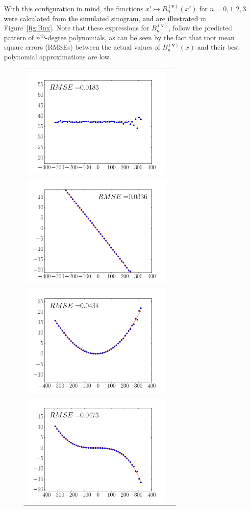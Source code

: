 \documentclass[letterpaper,twocolumn]{IEEEtran}
\newcommand{\bv}{\mathbf{v}}
\newcommand{\Bnv}{B_n^{(\bv)}}
\begin{document}
With this configuration in mind, the functions $x' \mapsto \Bnv(x')$ for $n = 0,1,2,3$ were calculated from the simulated sinogram, and are illustrated in Figure~\ref{fig:Bnx}. Note that these expressions for $\Bnv$, follow the predicted pattern of $n^{\textrm{th}}$-degree polynomials, as can be seen by the fact that root mean square errors (RMSEs) between the actual values of $\Bnv(x)$ and their best polynomial approximations are low.
\begin{figure}
	\centering
	\begin{tabular}{cc}
	\includegraphics[width=75mm]{figs/B0.png} \\
	\includegraphics[width=75mm]{figs/B1.png} \\
	\includegraphics[width=75mm]{figs/B2.png} \\
	\includegraphics[width=75mm]{figs/B3.png} 

\end{tabular}
\end{figure}
\end{document}
